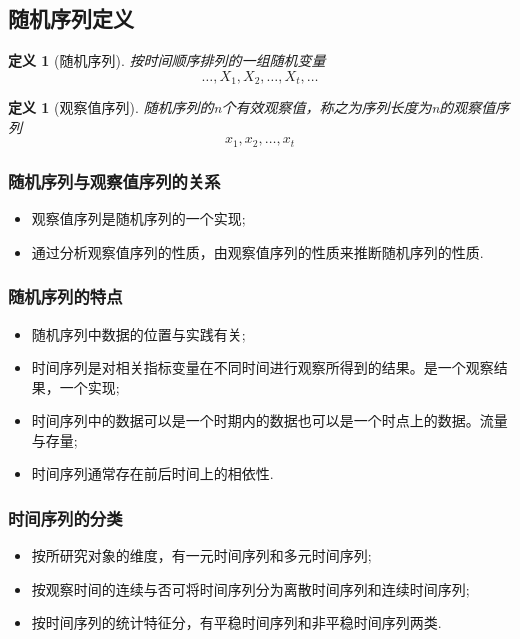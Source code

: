\documentclass[12pt, a4paper, oneside]{ctexbook}
\newtheorem{definition}[theorem]{定义}
\begin{document}
\subsection{随机序列定义}
\begin{definition}[随机序列]
    按时间顺序排列的一组随机变量
    \begin{equation*}
        \ldots,X_1,X_2,\ldots,X_{t},\ldots
    \end{equation*}
\end{definition}

\begin{definition}[观察值序列]
    随机序列的n个有效观察值，称之为序列长度为n的观察值序列
    \begin{equation*}
        x_1,x_2,\ldots,x_{t}
    \end{equation*}
\end{definition}

\subsubsection{随机序列与观察值序列的关系}
\begin{itemize}
    \item 观察值序列是随机序列的一个实现;
    \item 通过分析观察值序列的性质，由观察值序列的性质来推断随机序列的性质.
\end{itemize}

\subsubsection*{随机序列的特点}
\begin{itemize}
    \item 随机序列中数据的位置与实践有关;
    \item 时间序列是对相关指标变量在不同时间进行观察所得到的结果。是一个观察结果，一个实现;
    \item 时间序列中的数据可以是一个时期内的数据也可以是一个时点上的数据。流量与存量;
    \item 时间序列通常存在前后时间上的相依性.
\end{itemize}

\subsubsection*{时间序列的分类}
\begin{itemize}
    \item 按所研究对象的维度，有一元时间序列和多元时间序列;
    \item 按观察时间的连续与否可将时间序列分为离散时间序列和连续时间序列;
    \item 按时间序列的统计特征分，有平稳时间序列和非平稳时间序列两类.
\end{itemize}
\end{document}
